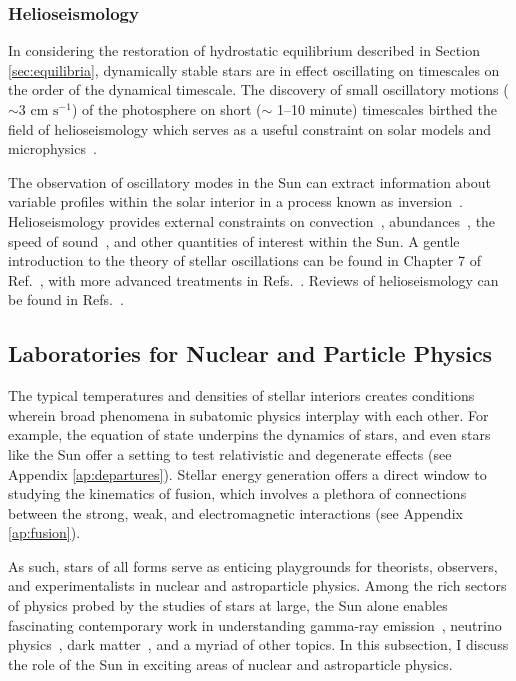 \documentclass[12pt]{article}
\begin{document}
\subsubsection{Helioseismology}
In considering the restoration of hydrostatic equilibrium described in Section \ref{sec:equilibria}, dynamically stable stars are in effect oscillating on timescales on the order of the dynamical timescale. The discovery of small oscillatory motions ($ \sim 3 \text{ cm} \text{ s}^{-1}$) of the photosphere on short ($\sim$ 1--10 minute) timescales birthed the field of helioseismology which serves as a useful constraint on solar models and microphysics~\cite{Phillips1999}. 

The observation of oscillatory modes in the Sun can extract information about variable profiles within the solar interior in a process known as inversion~\cite{Buldgen_2019}. Helioseismology provides external constraints on convection~\cite{Hanasoge_2016}, abundances~\cite{Basu_2008}, the speed of sound~\cite{CD1985Nature}, and other quantities of interest within the Sun. A gentle introduction to the theory of stellar oscillations can be found in Chapter 7 of Ref.~\cite{Phillips1999}, with more advanced treatments in Refs.~\cite{HK_book,PulsatingCox,Cox_Giuli_vol2}. Reviews of helioseismology can be found in Refs.~\cite{Pall2015,CDHelioseismology}.



\subsection{Laboratories for Nuclear and Particle Physics}
The typical temperatures and densities of stellar interiors creates conditions wherein broad phenomena in subatomic physics interplay with each other. For example, the equation of state underpins the dynamics of stars, and even stars like the Sun offer a setting to test relativistic and degenerate effects (see Appendix \ref{ap:departures}). Stellar energy generation offers a direct window to studying the kinematics of fusion, which involves a plethora of connections between the strong, weak, and electromagnetic interactions (see Appendix \ref{ap:fusion}).

As such, stars of all forms serve as enticing playgrounds for theorists, observers, and experimentalists in nuclear and astroparticle physics. Among the rich sectors of physics probed by the studies of stars at large, the Sun alone enables fascinating contemporary work in understanding gamma-ray emission~\cite{OSUGamma2018,Puzzoni2023}, neutrino physics~\cite{SK2024,Borexino2017}, dark matter~\cite{Ranjan2023,IceCube2016}, and a myriad of other topics. In this subsection, I discuss the role of the Sun in exciting areas of nuclear and astroparticle physics.
\end{document}
